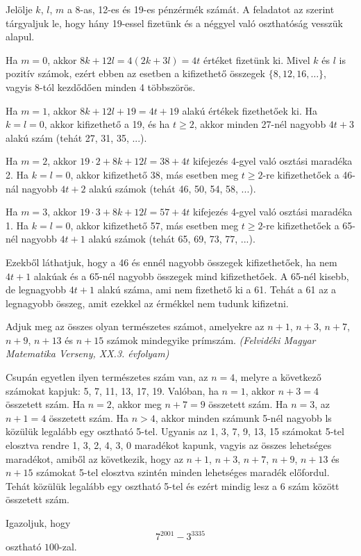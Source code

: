 \begin{solution}
Jelölje $k$, $l$, $m$ a 8-as, 12-es és 19-es pénzérmék számát.
A feladatot az szerint tárgyaljuk le, hogy hány 19-essel fizetünk
és a néggyel való oszthatóság vesszük alapul.

Ha $m=0$, akkor $8k+12l=4(2k+3l)=4t$ értéket fizetünk ki. Mivel
$k$ és $l$ is pozitív számok, ezért ebben az esetben a kifizethető
összegek $\{8,12,16,\dots\}$, vagyis 8-tól kezdődően minden 4 többszörös.

Ha $m=1$, akkor $8k+12l+19=4t+19$ alakú értékek fizethetőek ki.
Ha $k=l=0$, akkor kifizethető a 19, és ha $t\geq2$, akkor minden
27-nél nagyobb $4t+3$ alakú szám (tehát 27, 31, 35, ...).

Ha $m=2$, akkor $19\cdot2+8k+12l=38+4t$ kifejezés 4-gyel való osztási
maradéka 2. Ha $k=l=0$, akkor kifizethető 38, más esetben meg $t\geq2$-re
kifizethetőek a 46-nál nagyobb $4t+2$ alakú számok (tehát 46, 50,
54, 58, ...).

Ha $m=3$, akkor $19\cdot3+8k+12l=57+4t$ kifejezés 4-gyel való osztási
maradéka 1. Ha $k=l=0$, akkor kifizethető 57, más esetben meg $t\geq2$-re
kifizethetőek a 65-nél nagyobb $4t+1$ alakú számok (tehát 65, 69,
73, 77, ...).

Ezekből láthatjuk, hogy a 46 és ennél nagyobb összegek kifizethetőek,
ha nem $4t+1$ alakúak és a 65-nél nagyobb összegek mind kifizethetőek.
A 65-nél kisebb, de legnagyobb $4t+1$ alakú száma, ami nem fizethető
ki a 61. Tehát a 61 az a legnagyobb összeg, amit ezekkel az érmékkel
nem tudunk kifizetni. 
\end{solution}
\begin{extraproblem}
Adjuk meg az összes olyan természetes számot, amelyekre az $n+1$,
$n+3$, $n+7$, $n+9$, $n+13$ és $n+15$ számok mindegyike prímszám.
\emph{(Felvidéki Magyar Matematika Verseny, XX.3. évfolyam) }
\end{extraproblem}

\begin{solution}
Csupán egyetlen ilyen természetes szám van, az $n=4$, melyre a következő
számokat kapjuk: 5, 7, 11, 13, 17, 19. Valóban, ha $n=1$, akkor $n+3=4$
összetett szám. Ha $n=2$, akkor meg $n+7=9$ összetett szám. Ha $n=3$,
az $n+1=4$ összetett szám. Ha $n>4$, akkor minden számunk 5-nél
nagyobb ls közülük legalább egy osztható 5-tel. Ugyanis az 1, 3, 7,
9, 13, 15 számokat 5-tel elosztva rendre 1, 3, 2, 4, 3, 0 maradékot
kapunk, vagyis az összes lehetséges maradékot, amiből az következik,
hogy az $n+1$, $n+3$, $n+7$, $n+9$, $n+13$ és $n+15$ számokat
5-tel elosztva szintén minden lehetséges maradék előfordul. Tehát
közülük legalább egy osztható 5-tel és ezért mindig lesz a 6 szám
között összetett szám. 
\end{solution}
\begin{extraproblem}
Igazoljuk, hogy 
\[
7^{2001}-3^{3335}
\]
osztható $100$-zal. 
\end{extraproblem}

